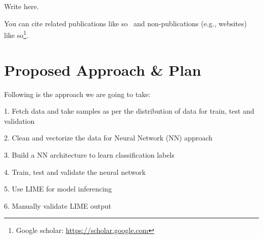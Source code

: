 \documentclass[11pt,letterpaper]{article}
\begin{document}
Write here.

You can cite related publications like so~\cite{vapnik1994measuring} and non-publications (e.g., websites) like so\footnote{Google scholar: \url{https://scholar.google.com}}.


\section{Proposed Approach \& Plan}




Following is the approach we are going to take:


1. Fetch data and take samples as per the distribution of data for train, test and validation

2. Clean and vectorize the data for Neural Network (NN) approach

3. Build a NN architecture to learn classification labels

4. Train, test and validate the neural network

5. Use LIME for model inferencing

6. Manually validate LIME output
\end{document}
